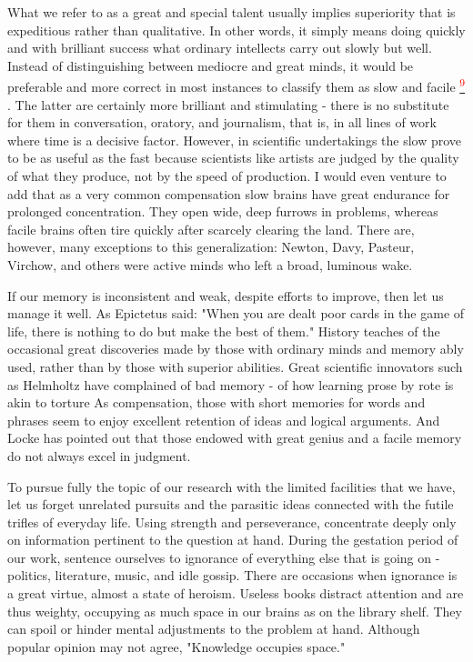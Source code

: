 \documentclass{article}
\newcommand{\noteref}[1]{%
 \hypertarget{ref:#1}{}%
 \hyperlink{note:#1}{\textsuperscript{\textcolor{red}{#1}}}%
}
\begin{document}
What we refer to as a great and special talent usually implies superiority that is expeditious rather than qualitative. In other words, it simply means doing quickly and with brilliant success what ordinary intellects carry out slowly but well. Instead of distinguishing between mediocre and great minds, it would be preferable and more correct in most instances to classify them as slow and facile\noteref{9}. The latter are certainly more brilliant and stimulating - there is no substitute for them in conversation, oratory, and journalism, that is, in all lines of work where time is a decisive factor. However, in scientific undertakings the slow prove to be as useful as the fast because scientists like artists are judged by the quality of what they produce, not by the speed of production. I would even venture to add that as a very common compensation slow brains have great endurance for prolonged concentration. They open wide, deep furrows in problems, whereas facile brains often tire quickly after scarcely clearing the land. There are, however, many exceptions to this generalization: Newton, Davy, Pasteur, Virchow, and others were active minds who left a broad, luminous wake.

If our memory is inconsistent and weak, despite efforts to improve, then let us manage it well. As Epictetus said: "When you are dealt poor cards in the game of life, there is nothing to do but make the best of them." History teaches of the occasional great discoveries made by those with ordinary minds and memory ably used, rather than by those with superior abilities. Great scientific innovators such as Helmholtz have complained of bad memory - of how learning prose by rote is akin to torture\! As compensation, those with short memories for words and phrases seem to enjoy excellent retention of ideas and logical arguments. And Locke has pointed out that those endowed with great genius and a facile memory do not always excel in judgment.

To pursue fully the topic of our research with the limited facilities that we have, let us forget unrelated pursuits and the parasitic ideas connected with the futile trifles of everyday life. Using strength and perseverance, concentrate deeply only on information pertinent to the question at hand. During the gestation period of our work, sentence ourselves to ignorance of everything else that is going on - politics, literature, music, and idle gossip. There are occasions when ignorance is a great virtue, almost a state of heroism. Useless books distract attention and are thus weighty, occupying as much space in our brains as on the library shelf. They can spoil or hinder mental adjustments to the problem at hand. Although popular opinion may not agree, "Knowledge occupies space."
\end{document}

